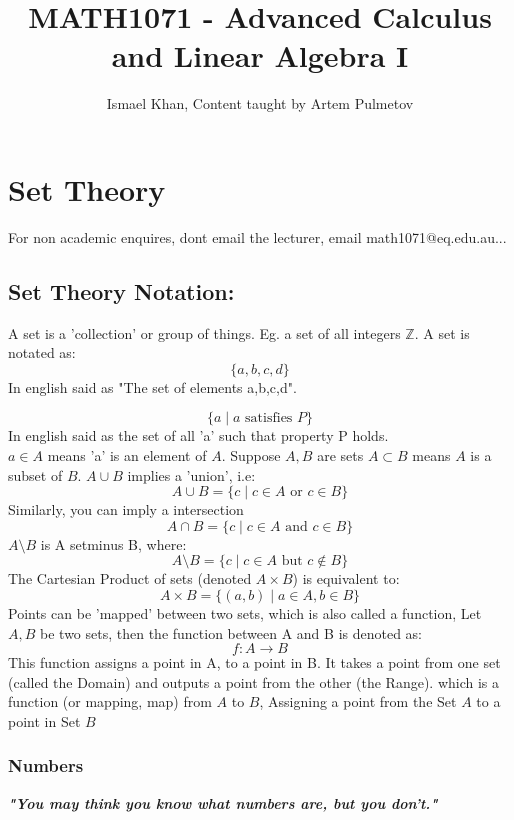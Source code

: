 \documentclass[a4paper, notitlepage]{report}
\title{MATH1071 - Advanced Calculus and Linear Algebra I}
\author{Ismael Khan, Content taught by Artem Pulmetov}
\date{}
\theoremstyle{remark}
\theoremstyle{definition}
\begin{document}
    \maketitle
    \tableofcontents
    \newpage
    \chapter{Set Theory}
        For non academic enquires, dont email the lecturer, email math1071@eq.edu.au...
        \section{Set Theory Notation:}
            
            A set is a 'collection' or group of things. Eg. a set of all integers $\mathbb{Z}$. A set is notated as:
            $$\{a,b,c,d\}$$
            In english said as "The set of elements a,b,c,d".
            
            $$\{a \mid a \text{ satisfies } P\}$$
            In english said as the set of all 'a' such that property P holds.
            \\ $a \in A$ means 'a' is an element of \( A \).
            Suppose \( A,B \) are sets
            $A\subset B$ means \( A \) is a subset of \( B \). $A \cup B$ implies a 'union', i.e:
            $$A \cup B = \{c \mid c \in A \text{ or } c \in B\}$$ 
            Similarly, you can imply a intersection
            $$A \cap B = \{c \mid c \in A \text{ and } c \in B\}$$
            $A \setminus B$ is A setminus B, where:
            $$A \setminus B = \{c \mid c\in A \text{ but } c \notin B\}$$
            The Cartesian Product of sets (denoted $A\times B$) is equivalent to:
            $$A\times B = \{(a,b) \mid a \in A, b \in B\}$$
            Points can be 'mapped' between two sets, which is also called a function, Let $A,B$ be two sets,
            then the function between A and B is denoted as:
            $$f: A \rightarrow B$$
            This function assigns a point in A, to a point in B. It takes a point from one set (called the Domain)
            and outputs a point from the other (the Range). which is a function
	    (or mapping, map) from \( A \) to \( B \), Assigning a point from
	    the Set \( A \) to a point in Set \( B \)
            

            \subsection{Numbers}
	    \begin{center}
            \textbf{\textit{"You may think you know what numbers are, but you
	    don't."}}
	    \end{center}
\end{document}
